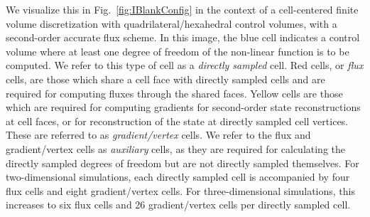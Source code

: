 We visualize this in Fig.~\ref{fig:IBlankConfig} in the context of a cell-centered finite volume discretization with quadrilateral/hexahedral control volumes, with a second-order accurate flux scheme. In this image, the blue cell indicates a control volume where at least one degree of freedom of the non-linear function is to be computed. We refer to this type of cell as a \textit{directly sampled} cell. Red cells, or \textit{flux} cells, are those which share a cell face with directly sampled cells and are required for computing fluxes through the shared faces. Yellow cells are those which are required for computing gradients for second-order state reconstructions at cell faces, or for reconstruction of the state at directly sampled cell vertices. These are referred to as \textit{gradient/vertex} cells. We refer to the flux and gradient/vertex cells as \textit{auxiliary} cells, as they are required for calculating the directly sampled degrees of freedom but are not directly sampled themselves. For two-dimensional simulations, each directly sampled cell is accompanied by four flux cells and eight gradient/vertex cells. For three-dimensional simulations, this increases to six flux cells and 26 gradient/vertex cells per directly sampled cell.


